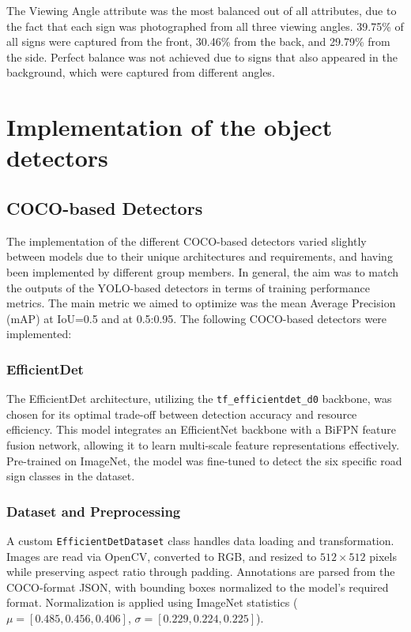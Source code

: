 \documentclass{article}
\begin{document}
The Viewing Angle attribute was the most balanced out of all attributes, due to the fact that each sign was photographed from all three viewing angles. 39.75\% of all signs were captured from the front, 30.46\% from the back, and 29.79\% from the side. Perfect balance was not achieved due to signs that also appeared in the background, which were captured from different angles.

\section{Implementation of the object detectors}
\subsection{COCO-based Detectors}
The implementation of the different COCO-based detectors varied slightly between models due to their unique architectures and requirements, and having been implemented by different group members. In general, the aim was to match the outputs of the YOLO-based detectors in terms of training performance metrics. The main metric we aimed to optimize was the mean Average Precision (mAP) at IoU=0.5 and at 0.5:0.95.
The following COCO-based detectors were implemented:
\subsubsection{EfficientDet}
The EfficientDet architecture, utilizing the \texttt{tf\_efficientdet\_d0} backbone, was chosen for its optimal trade-off between detection accuracy and resource efficiency. This model integrates an EfficientNet backbone with a BiFPN feature fusion network, allowing it to learn multi-scale feature representations effectively. Pre-trained on ImageNet, the model was fine-tuned to detect the six specific road sign classes in the dataset.

\subsubsection*{Dataset and Preprocessing}
A custom \texttt{EfficientDetDataset} class handles data loading and transformation. Images are read via OpenCV, converted to RGB, and resized to $512 \times 512$ pixels while preserving aspect ratio through padding. Annotations are parsed from the COCO-format JSON, with bounding boxes normalized to the model's required format. Normalization is applied using ImageNet statistics ($\mu=[0.485, 0.456, 0.406]$, $\sigma=[0.229, 0.224, 0.225]$).
\end{document}
